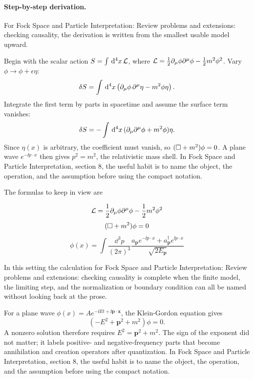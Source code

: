 \paragraph{Step-by-step derivation.}

For Fock Space and Particle Interpretation: Review problems and extensions: checking causality, the derivation is written from the smallest usable model upward.

Begin with the scalar action \(S=\int\,\mathrm d^4x\,\mathcal L\), where \(\mathcal L=\frac12\partial_\mu\phi\partial^\mu\phi-\frac12m^2\phi^2\).  Vary \(\phi\to\phi+\epsilon\eta\):
\[
  \delta S=\int\,\mathrm d^4x\left(\partial_\mu\phi\,\partial^\mu\eta-m^2\phi\eta\right).
\]
Integrate the first term by parts in spacetime and assume the surface term vanishes:
\[
  \delta S=-\int\,\mathrm d^4x\,(\partial_\mu\partial^\mu\phi+m^2\phi)\eta.
\]
Since \(\eta(x)\) is arbitrary, the coefficient must vanish, so \((\Box+m^2)\phi=0\).  A plane wave \(e^{-\ii p\cdot x}\) then gives \(p^2=m^2\), the relativistic mass shell.  In Fock Space and Particle Interpretation, section 8, the useful habit is to name the object, the operation, and the assumption before using the compact notation.

The formulas to keep in view are

\[
  \mathcal L=\frac12\partial_\mu\phi\partial^\mu\phi-\frac12m^2\phi^2
\]
\[
  (\Box+m^2)\phi=0
\]
\[
  \phi(x)=\int\frac{\dd^3p}{(2\pi)^3}\frac{a_{\bm p}e^{-\ii p\cdot x}+a_{\bm p}^\dagger e^{\ii p\cdot x}}{\sqrt{2E_{\bm p}}}
\]

In this setting the calculation for Fock Space and Particle Interpretation: Review problems and extensions: checking causality is complete when the finite model, the limiting step, and the normalization or boundary condition can all be named without looking back at the prose.




\begin{example}
For a plane wave \(\phi(x)=Ae^{-\ii Et+\ii\bm p\cdot\bm x}\), the Klein-Gordon equation gives
\[
  (-E^2+\bm p^2+m^2)\phi=0.
\]
A nonzero solution therefore requires \(E^2=\bm p^2+m^2\).  The sign of the exponent did not matter; it labels positive- and negative-frequency parts that become annihilation and creation operators after quantization.  In Fock Space and Particle Interpretation, section 8, the useful habit is to name the object, the operation, and the assumption before using the compact notation.
\end{example}



